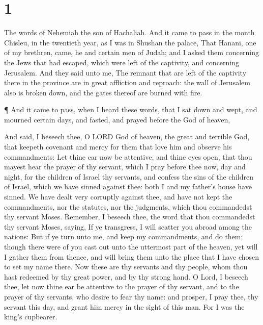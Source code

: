 \hypertarget{section}{%
\section{1}\label{section}}

 The words of Nehemiah the son of Hachaliah. And it came to
pass in the month Chisleu, in the twentieth year, as I was in Shushan
the palace,  That Hanani, one of my brethren, came, he and
certain men of Judah; and I asked them concerning the Jews that had
escaped, which were left of the captivity, and concerning Jerusalem.
 And they said unto me, The remnant that are left of the
captivity there in the province are in great affliction and reproach:
the wall of Jerusalem also is broken down, and the gates thereof are
burned with fire.

 ¶ And it came to pass, when I heard these words, that I sat
down and wept, and mourned certain days, and fasted, and prayed before
the God of heaven,

 And said, I beseech thee, O LORD God of heaven, the great
and terrible God, that keepeth covenant and mercy for them that love him
and observe his commandments:  Let thine ear now be
attentive, and thine eyes open, that thou mayest hear the prayer of thy
servant, which I pray before thee now, day and night, for the children
of Israel thy servants, and confess the sins of the children of Israel,
which we have sinned against thee: both I and my father's house have
sinned.  We have dealt very corruptly against thee, and have
not kept the commandments, nor the statutes, nor the judgments, which
thou commandedst thy servant Moses.  Remember, I beseech
thee, the word that thou commandedst thy servant Moses, saying, If ye
transgress, I will scatter you abroad among the nations: 
But if ye turn unto me, and keep my commandments, and do them; though
there were of you cast out unto the uttermost part of the heaven, yet
will I gather them from thence, and will bring them unto the place that
I have chosen to set my name there.  Now these are thy
servants and thy people, whom thou hast redeemed by thy great power, and
by thy strong hand.  O Lord, I beseech thee, let now thine
ear be attentive to the prayer of thy servant, and to the prayer of thy
servants, who desire to fear thy name: and prosper, I pray thee, thy
servant this day, and grant him mercy in the sight of this man. For I
was the king's cupbearer.

